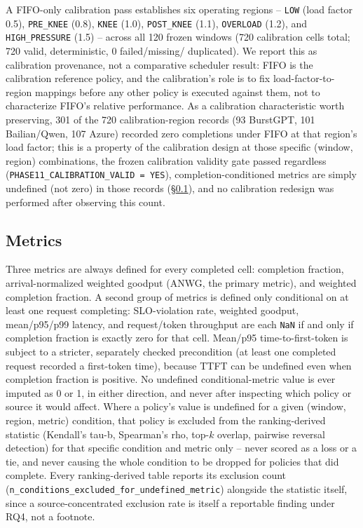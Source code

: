 \documentclass[sn-basic,Numbered,pdflatex]{sn-jnl}
\begin{document}
A FIFO-only calibration pass establishes six operating regions --
\texttt{LOW} (load factor 0.5), \texttt{PRE\_KNEE} (0.8), \texttt{KNEE}
(1.0), \texttt{POST\_KNEE} (1.1), \texttt{OVERLOAD} (1.2), and
\texttt{HIGH\_PRESSURE} (1.5) -- across all 120 frozen windows (720
calibration cells total; 720 valid, deterministic, 0 failed/missing/
duplicated). We report this as calibration provenance, not a comparative
scheduler result: FIFO is the calibration reference policy, and the
calibration's role is to fix load-factor-to-region mappings before any
other policy is executed against them, not to characterize FIFO's relative
performance. As a calibration characteristic worth preserving, 301 of the
720 calibration-region records (93 BurstGPT, 101 Bailian/Qwen, 107 Azure)
recorded zero completions under FIFO at that region's load factor; this is
a property of the calibration design at those specific (window, region)
combinations, the frozen calibration validity gate passed regardless
(\texttt{PHASE11\_CALIBRATION\_VALID = YES}), completion-conditioned metrics
are simply undefined (not zero) in those records
(\S\ref{sec:metrics}), and no calibration redesign was performed after
observing this count.

\subsection{Metrics}
\label{sec:metrics}

Three metrics are always defined for every completed cell: completion
fraction, arrival-normalized weighted goodput (ANWG, the primary metric),
and weighted completion fraction. A second group of metrics is defined
only conditional on at least one request completing: SLO-violation rate,
weighted goodput, mean/p95/p99 latency, and request/token throughput are
each \texttt{NaN} if and only if completion fraction is exactly zero for
that cell. Mean/p95 time-to-first-token is subject to a stricter,
separately checked precondition (at least one completed request recorded a
first-token time), because TTFT can be undefined even when completion
fraction is positive. No undefined conditional-metric value is ever imputed
as 0 or 1, in either direction, and never after inspecting which policy or
source it would affect. Where a policy's value is undefined for a given
(window, region, metric) condition, that policy is excluded from the
ranking-derived statistic (Kendall's tau-b, Spearman's rho, top-$k$
overlap, pairwise reversal detection) for that specific condition and
metric only -- never scored as a loss or a tie, and never causing the whole
condition to be dropped for policies that did complete. Every
ranking-derived table reports its exclusion count
(\texttt{n\_conditions\_excluded\_for\_undefined\_metric}) alongside the
statistic itself, since a source-concentrated exclusion rate is itself a
reportable finding under RQ4, not a footnote.
\end{document}
